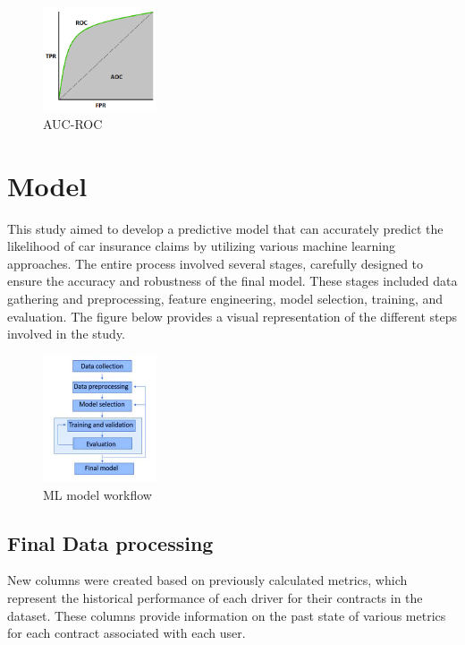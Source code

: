 \documentclass{IEEEtran}
\begin{document}
\begin{figure}[h]
\centering
\includegraphics[width=0.3\textwidth]{auc.png}
\caption{\label{fig:auc}AUC-ROC}
\end{figure}




\section{Model }

This study aimed to develop a predictive model that can accurately predict the likelihood of car insurance claims by utilizing various machine learning approaches. The entire process involved several stages, carefully designed to ensure the accuracy and robustness of the final model. These stages included data gathering and preprocessing, feature engineering, model selection, training, and evaluation. The figure below provides a visual representation of the different steps involved in the study. 


\begin{figure}[h]
\centering
\includegraphics[width=0.3\textwidth]{mod.JPG}
\caption{\label{fig:mod}ML model workflow}
\end{figure}

\subsection{Final Data processing }

New columns were created  based on previously calculated metrics, which represent the historical performance of each driver for their contracts in the dataset. These columns provide information on the past state of various metrics for each contract associated with each user.
\end{document}
